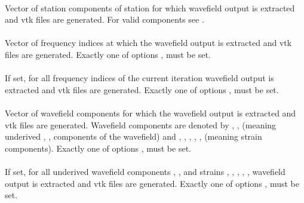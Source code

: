\paragraph{ }
Vector of  station components of station  for which wavefield output is
extracted and vtk files are generated. 
For valid components see .
\paragraph{}
Vector of  frequency indices at which the wavefield output is extracted and 
vtk files are generated. Exactly one of options  ,  must be set.
\paragraph{}
If set, for all frequency indices of the current iteration wavefield output is extracted and 
vtk files are generated. Exactly one of options  ,  must be set.
\paragraph{}
Vector of  wavefield components for which the wavefield output is extracted and 
vtk files are generated. 
Wavefield components are denoted by , ,  (meaning underived , , 
 components of the wavefield) and , , , , ,  
(meaning strain components). 
Exactly one of options ,  must be set.
\paragraph{}
If set, for all underived wavefield components , ,  and
strains , , , , ,  wavefield output is extracted and 
vtk files are generated. 
Exactly one of options ,  must be set.

